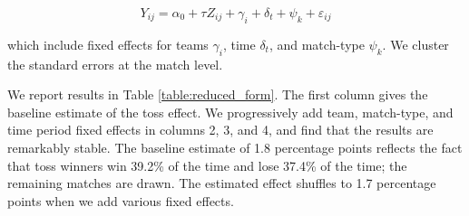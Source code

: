 \documentclass[12pt, letterpaper]{article}
\begin{document}
\begin{equation}\label{eqn:reduced_form}
Y_{ij} = \alpha_0 + \tau Z_{ij} + \gamma_i + \delta_t + \psi_k + \varepsilon_{ij}
\end{equation}

which include fixed effects for teams $\gamma_i$, time $\delta_t$, and match-type $\psi_k$. We cluster the standard errors at the match level.

We report results in Table \ref{table:reduced_form}. The first column gives the baseline estimate of the toss effect. We progressively add team, match-type, and time period fixed effects in columns 2, 3, and 4, and find that the results are remarkably stable. The baseline estimate of 1.8 percentage points reflects the fact that toss winners win 39.2\% of the time and lose 37.4\% of the time; the remaining matches are drawn. The estimated effect shuffles to 1.7 percentage points when we add various fixed effects.
\end{document}
